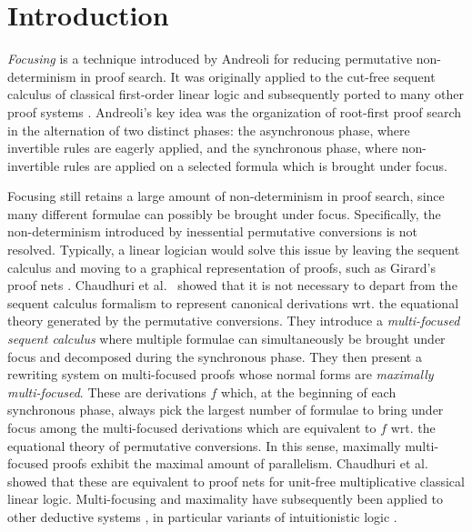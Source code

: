 \documentclass[runningheads]{llncs}
\begin{document}
\section{Introduction}\label{sec:intro}

\emph{Focusing} is a technique introduced by Andreoli for reducing permutative non-determinism in proof search. It was originally applied to the cut-free sequent calculus of classical first-order linear logic \cite{andreoli:logic:1992} and subsequently ported to many other proof systems \cite{LiangM09}. Andreoli's key idea was the organization of root-first proof search in the alternation of two distinct phases: the asynchronous phase, where invertible rules are eagerly applied, and the synchronous phase, where non-invertible rules are applied on a selected formula which is brought under focus.

Focusing still retains a large amount of non-determinism in proof search, since many different formulae can possibly be brought under focus. Specifically, the non-determinism introduced by inessential permutative conversions is not resolved. Typically, a linear logician would solve this issue by leaving the sequent calculus and moving to a graphical representation of proofs, such as Girard's proof nets \cite{Girard87}. Chaudhuri et al.~\cite{chaudhuri:canonical:2008} showed that it is not necessary to depart from the sequent calculus formalism to represent canonical derivations wrt. the equational theory generated by the permutative conversions. They introduce a \emph{multi-focused sequent calculus} where multiple formulae can simultaneously be brought under focus and decomposed during the synchronous phase. They then present a rewriting system on multi-focused proofs whose normal forms are \emph{maximally multi-focused}. These are derivations $f$ which, at the beginning of each synchronous phase, always pick the largest number of formulae to bring under focus among the multi-focused derivations which are equivalent to $f$ wrt. the equational theory of permutative conversions. In this sense, maximally multi-focused proofs exhibit the maximal amount of parallelism. Chaudhuri et al. showed that these are equivalent to proof nets for unit-free multiplicative classical linear logic. Multi-focusing and maximality have subsequently been applied to other deductive systems \cite{ChaudhuriHM16,Brock-Nannestad18}, in particular variants of intuitionistic logic \cite{Scherer15,PimentelNN16}.
\end{document}
